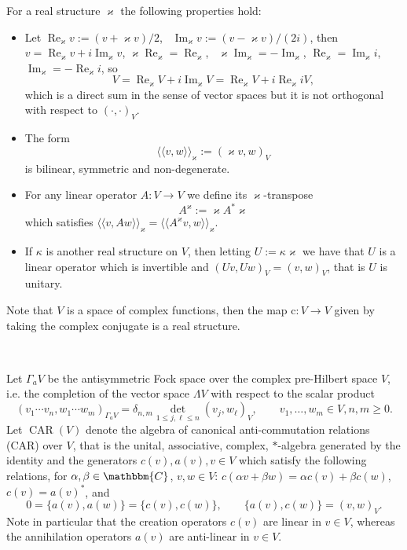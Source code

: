\documentclass[11pt]{article}
\newcommand{\assign}{:=}
\newcommand{\cdummy}{\cdot}
\newcommand{\llangle}{{\langle\!\langle}}
\newcommand{\rrangle}{{\rangle\!\rangle}}
\newcommand{\tmop}[1]{\ensuremath{\operatorname{#1}}}
\newenvironment{itemizedot}{\begin{itemize} \renewcommand{\labelitemi}{$\bullet$}\renewcommand{\labelitemii}{$\bullet$}\renewcommand{\labelitemiii}{$\bullet$}\renewcommand{\labelitemiv}{$\bullet$}}{\end{itemize}}
\begin{document}
For a real structure $\varkappa$ the following properties hold:
\begin{itemizedot}
  \item Let $\tmop{Re}_{\varkappa} v \assign (v + \varkappa v) / 2$, \
  $\tmop{Im}_{\varkappa} v \assign (v - \varkappa v) / (2 i)$, then $v =
  \tmop{Re}_{\varkappa} v + i \tmop{Im}_{\varkappa} v$, $\varkappa
  \tmop{Re}_{\varkappa} = \tmop{Re}_{\varkappa}$, \ $\varkappa
  \tmop{Im}_{\varkappa} = - \tmop{Im}_{\varkappa}$, $\tmop{Re}_{\varkappa} =
  \tmop{Im}_{\varkappa} i$, \ $\tmop{Im}_{\varkappa} = - \tmop{Re}_{\varkappa}
  i$, so
  \[ V = \tmop{Re}_{\varkappa} V + i \tmop{Im}_{\varkappa} V =
     \tmop{Re}_{\varkappa} V + i \tmop{Re}_{\varkappa} i V, \]
  which is a direct sum in the sense of vector spaces but it is not orthogonal
  with respect to $(\cdummy, \cdummy)_V$.
  
  \item The form
  \[ \llangle v, w \rrangle_{\varkappa} \assign (\varkappa v, w)_V \]
  is bilinear, symmetric and non-degenerate.
  
  \item For any linear operator $A : V \rightarrow V$ we define its
  $\varkappa$-transpose
  \[ A^{\varkappa} \assign \varkappa A^{\ast} \varkappa \]
  which satisfies $\llangle v, A w \rrangle_{\varkappa} = \llangle
  A^{\varkappa} v, w \rrangle_{\varkappa}$.
  
  \item If $\kappa$ is another real structure on $V$, then letting $U \assign
  \kappa \varkappa$ we have that $U$ is a linear operator which is invertible
  and $(U v, U w)_V = (v, w)_V$, that is $U$ is unitary.
\end{itemizedot}


Note that $V$ is a space of complex functions, then the map $\mathrm{c}: V
\rightarrow V$ given by taking the complex conjugate is a real structure.

\

Let $\Gamma_a V$ be the antisymmetric Fock space over the complex pre-Hilbert
space $V$, i.e. the completion of the vector space $\Lambda V$ with respect to
the scalar product
\[ (v_1 \cdots v_n, w_1 \cdots w_m)_{\Gamma_a V} = \delta_{n, m} \underset{1
   \leqslant j, \ell \leqslant n}{\det} (v_j, w_{\ell})_V, \qquad v_1, \ldots,
   w_m \in V, n, m \geqslant 0. \]
Let $\tmop{CAR} (V)$ denote the algebra of canonical anti-commutation
relations (CAR) over $V$, that is the unital, associative, complex,
$\ast$-algebra generated by the identity and the generators $c (v), a (v), v
\in V$ which satisfy the following relations, for $\alpha, \beta \in
\mathbbm{C}$, $v, w \in V$: $c (\alpha v + \beta w) = \alpha c (v) + \beta c
(w)$, $c (v) = a (v)^{\ast}$, and
\[ 0 = \{ a (v), a (w) \} = \{ c (v), c (w) \}, \qquad \{ a (v), c (w) \} =
   (v, w)_V . \]
Note in particular that the creation operators $c (v)$ are linear in $v \in
V$, whereas the annihilation operators $a (v)$ are anti-linear in $v \in V$.
\end{document}
